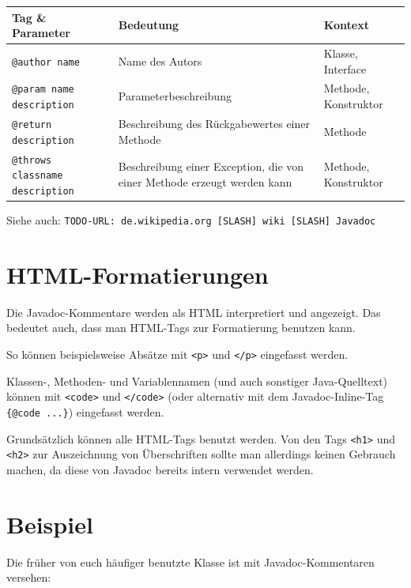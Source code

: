 \medskip
\bgroup
\def\arraystretch{1.2}
\begin{tabularx}{\textwidth}{|X|p{55mm}|p{30mm}|}\hline
\textbf{Tag \& Parameter} & \textbf{Bedeutung} & \textbf{Kontext} \\ \hline
\texttt{@author name} & Name des Autors & Klasse, Interface \\ \hline
\texttt{@param name description} & Parameterbeschreibung & Methode, Konstruktor \\ \hline 
\texttt{@return description} & Beschreibung des Rückgabewertes einer Methode
& Methode \\ \hline
\texttt{@throws classname description} & Beschreibung einer Exception, die
von einer Methode erzeugt werden kann & Methode, Konstruktor \\ \hline
\end{tabularx}
\egroup

\medskip
Siehe auch: \texttt{TODO-URL: de.wikipedia.org [SLASH] wiki [SLASH] Javadoc} %


\section{HTML-Formatierungen}

Die Javadoc-Kommentare werden als HTML interpretiert und angezeigt. Das bedeutet
auch, dass man HTML-Tags zur Formatierung benutzen kann.

So können beispielsweise Absätze mit \lstinline|<p>| und \lstinline|</p>|
eingefasst werden.

Klassen-, Methoden- und Variablennamen (und auch sonstiger Java-Quelltext) können
mit \lstinline|<code>| und \lstinline|</code>| (oder alternativ mit dem
Javadoc-Inline-Tag \lstinline|{@code ...}|) eingefasst werden.

Grundsätzlich können alle HTML-Tags benutzt werden. Von den
Tags \lstinline|<h1>| und \lstinline|<h2>| zur Auszeichnung von Überschriften
sollte man allerdings keinen Gebrauch machen, da diese von Javadoc bereits
intern verwendet werden.


\section{Beispiel}

Die früher von euch häufiger benutzte Klasse  ist mit
Javadoc-Kommentaren versehen:

